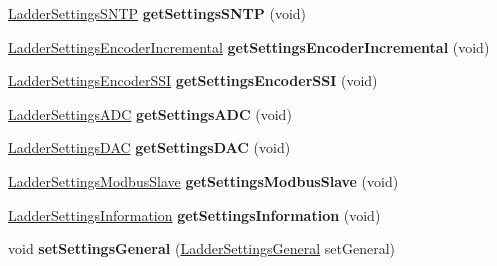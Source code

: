 \begin{DoxyCompactItemize}
\item 
\hypertarget{class_ladder_diagram_ae4ea634df989511e59bc79026163216e}{\hyperlink{struct_ladder_settings_s_n_t_p}{Ladder\-Settings\-S\-N\-T\-P} {\bfseries get\-Settings\-S\-N\-T\-P} (void)}\label{class_ladder_diagram_ae4ea634df989511e59bc79026163216e}

\item 
\hypertarget{class_ladder_diagram_ace931be043f897501ed392c77d24c720}{\hyperlink{struct_ladder_settings_encoder_incremental}{Ladder\-Settings\-Encoder\-Incremental} {\bfseries get\-Settings\-Encoder\-Incremental} (void)}\label{class_ladder_diagram_ace931be043f897501ed392c77d24c720}

\item 
\hypertarget{class_ladder_diagram_a0fbd49c86820862eaf80703823abc7d6}{\hyperlink{struct_ladder_settings_encoder_s_s_i}{Ladder\-Settings\-Encoder\-S\-S\-I} {\bfseries get\-Settings\-Encoder\-S\-S\-I} (void)}\label{class_ladder_diagram_a0fbd49c86820862eaf80703823abc7d6}

\item 
\hypertarget{class_ladder_diagram_af9ef1953c10507a77b123a051477ae17}{\hyperlink{struct_ladder_settings_a_d_c}{Ladder\-Settings\-A\-D\-C} {\bfseries get\-Settings\-A\-D\-C} (void)}\label{class_ladder_diagram_af9ef1953c10507a77b123a051477ae17}

\item 
\hypertarget{class_ladder_diagram_a2cc670c40ac87e684c15efd3b64a7c69}{\hyperlink{struct_ladder_settings_d_a_c}{Ladder\-Settings\-D\-A\-C} {\bfseries get\-Settings\-D\-A\-C} (void)}\label{class_ladder_diagram_a2cc670c40ac87e684c15efd3b64a7c69}

\item 
\hypertarget{class_ladder_diagram_ae2c4361e1b0117b6293c314a792149e1}{\hyperlink{struct_ladder_settings_modbus_slave}{Ladder\-Settings\-Modbus\-Slave} {\bfseries get\-Settings\-Modbus\-Slave} (void)}\label{class_ladder_diagram_ae2c4361e1b0117b6293c314a792149e1}

\item 
\hypertarget{class_ladder_diagram_a264f5366c2974e9b1e092a13d59663ce}{\hyperlink{struct_ladder_settings_information}{Ladder\-Settings\-Information} {\bfseries get\-Settings\-Information} (void)}\label{class_ladder_diagram_a264f5366c2974e9b1e092a13d59663ce}

\item 
\hypertarget{class_ladder_diagram_abb54908c040bb713b478b36e6832ecf4}{void {\bfseries set\-Settings\-General} (\hyperlink{struct_ladder_settings_general}{Ladder\-Settings\-General} set\-General)}\label{class_ladder_diagram_abb54908c040bb713b478b36e6832ecf4}


\end{DoxyCompactItemize}
